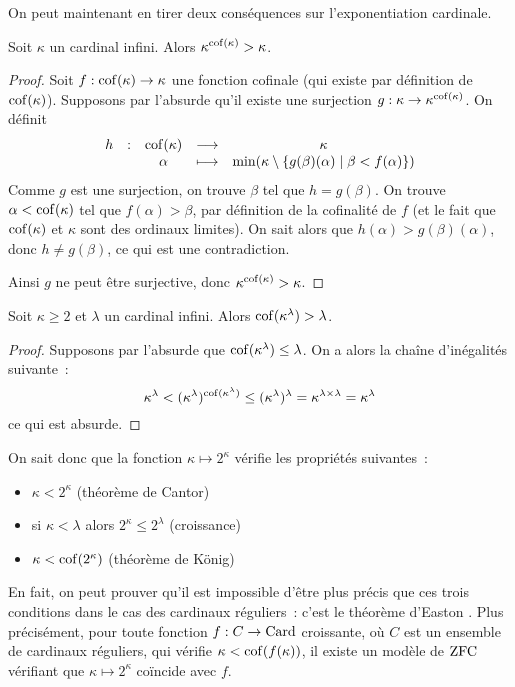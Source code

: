 On peut maintenant en tirer deux conséquences sur l'exponentiation cardinale.

\begin{proposition}
  Soit $\kappa$ un cardinal infini. Alors $\kappa^{\operatorname{cof}(\kappa)} > \kappa$.
\end{proposition}

\begin{proof}
  Soit $f : \operatorname{cof}(\kappa) \to \kappa$ une fonction cofinale (qui existe par
  définition de $\operatorname{cof}(\kappa)$). Supposons par l'absurde qu'il existe une
  surjection $g : \kappa \to \kappa^{\operatorname{cof}(\kappa)}$. On définit
  \[\begin{array}{ccccc}
  h & : & \operatorname{cof}(\kappa) & \longrightarrow & \kappa \\
  & & \alpha & \longmapsto &
  \min(\kappa \setminus\{g(\beta)(\alpha)\mid \beta < f(\alpha)\})
  \end{array}\]
  Comme $g$ est une surjection, on trouve $\beta$ tel que $h = g(\beta)$. On
  trouve $\alpha < \operatorname{cof}(\kappa)$ tel que $f(\alpha) > \beta$, par définition de
  la cofinalité de $f$ (et le fait que $\operatorname{cof}(\kappa)$ et $\kappa$ sont des
  ordinaux limites). On sait alors que $h(\alpha) > g(\beta)(\alpha)$, donc
  $h\neq g(\beta)$, ce qui est une contradiction.

  Ainsi $g$ ne peut être surjective, donc $\kappa^{\operatorname{cof}(\kappa)} > \kappa$.
\end{proof}

\begin{theorem}
  Soit $\kappa \geq 2$ et $\lambda$ un cardinal infini. Alors
  $\operatorname{cof}(\kappa^\lambda) > \lambda$.
\end{theorem}

\begin{proof}
  Supposons par l'absurde que $\operatorname{cof}(\kappa^\lambda) \leq \lambda$. On a alors la
  chaîne d'inégalités suivante~:
  \[\kappa^\lambda < (\kappa^\lambda)^{\operatorname{cof}(\kappa^\lambda)} \leq
  (\kappa^\lambda)^\lambda = \kappa^{\lambda \times \lambda} = \kappa^\lambda\]
  ce qui est absurde.
\end{proof}

On sait donc que la fonction $\kappa \mapsto 2^\kappa$ vérifie les propriétés
suivantes~:
\begin{itemize}
\item $\kappa < 2^\kappa$ (théorème de Cantor)
\item si $\kappa < \lambda$ alors $2^\kappa \leq 2^\lambda$ (croissance)
\item $\kappa < \operatorname{cof}(2^\kappa)$ (théorème de König)
\end{itemize}

En fait, on peut prouver qu'il est impossible d'être plus précis que ces trois
conditions dans le cas des cardinaux réguliers~: c'est le théorème d'Easton
\cite{Easton}. Plus précisément, pour toute fonction $f : C \to \operatorname{Card}$
croissante, où $C$ est un ensemble de cardinaux réguliers, qui vérifie
$\kappa < \operatorname{cof}(f(\kappa))$, il existe un modèle de $\operatorname{ZFC}$ vérifiant que
$\kappa \mapsto 2^\kappa$ coïncide avec $f$.

